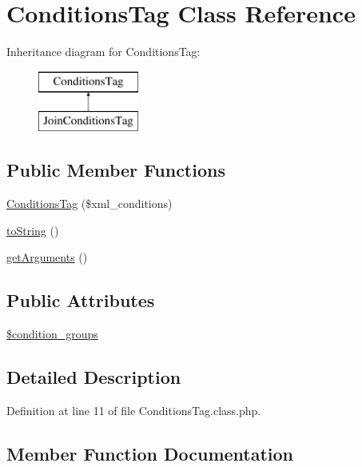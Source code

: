 \hypertarget{classConditionsTag}{}\section{Conditions\+Tag Class Reference}
\label{classConditionsTag}
Inheritance diagram for Conditions\+Tag\+:\begin{figure}[H]
\begin{center}
\leavevmode
\includegraphics[height=2.000000cm]{classConditionsTag}
\end{center}
\end{figure}
\subsection*{Public Member Functions}
\begin{DoxyCompactItemize}
\item 
\hyperlink{classConditionsTag_ac5624e3b396995621ca7f0502dc5bd5c}{Conditions\+Tag} (\$xml\+\_\+conditions)
\item 
\hyperlink{classConditionsTag_af458fe76fa1ffb006306c682e024ee5a}{to\+String} ()
\item 
\hyperlink{classConditionsTag_a8c7e8f873db4fa6e6c35920bed31afae}{get\+Arguments} ()
\end{DoxyCompactItemize}
\subsection*{Public Attributes}
\begin{DoxyCompactItemize}
\item 
\hyperlink{classConditionsTag_a494a016d168c8e44cd05638e6c991805}{\$condition\+\_\+groups}
\end{DoxyCompactItemize}


\subsection{Detailed Description}


Definition at line 11 of file Conditions\+Tag.\+class.\+php.



\subsection{Member Function Documentation}
\hypertarget{classConditionsTag_ac5624e3b396995621ca7f0502dc5bd5c}{}\label{classConditionsTag_ac5624e3b396995621ca7f0502dc5bd5c} 
